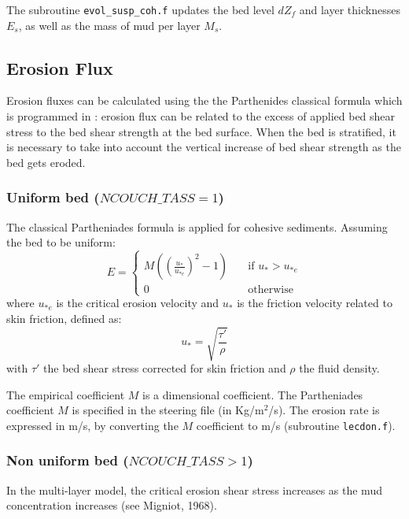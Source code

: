The subroutine \texttt{evol\_susp\_coh.f} updates the bed level $dZ_f$ and layer
thicknesses $E_s$, as well as the mass of mud per layer $M_s$. 

\subsection{Erosion Flux}
 Erosion fluxes can be calculated using the the Parthenides classical formula which is programmed in \sisyphe: erosion flux can 
be related to the excess of applied bed shear stress to the bed shear strength at the bed surface. 
When the bed is stratified, it is necessary to take into account
the vertical increase of bed shear strength as the bed gets eroded.
\subsubsection*{Uniform bed ($NCOUCH\_TASS = 1$)}
The classical Partheniades formula is applied for cohesive sediments.
Assuming the bed to be uniform: 
\begin{equation*}
E = \left\{\begin{array}{ll}
\displaystyle
M\left(\left(\frac{u_*}{u_{*e}}\right)^2-1\right) & \quad \text{if } u_* > u_{*e} \\
\displaystyle
0 & \quad \text{otherwise} 
\end{array}
\right.
\end{equation*}
where $u_{*e}$ is the critical erosion velocity and $u_*$ is the friction velocity related to skin
friction, defined as: 
\begin{equation*}
u_* =\sqrt{\frac{\tau'}{\rho}} 
\end{equation*}%
with $\tau'$ the bed shear stress corrected for skin
friction and $\rho$ the fluid density.

The empirical coefficient $M$ is a dimensional coefficient. The Partheniades
coefficient $M$ is specified in the steering file (in Kg/m$^2$/s). The
erosion rate is expressed in m/s, by converting the $M$ coefficient to m/s
(subroutine \texttt{lecdon.f}).

\subsubsection*{Non uniform bed ($NCOUCH\_TASS > 1$)}
In the multi-layer model, the critical erosion shear stress increases as the
mud concentration increases (see  Migniot, 1968).

